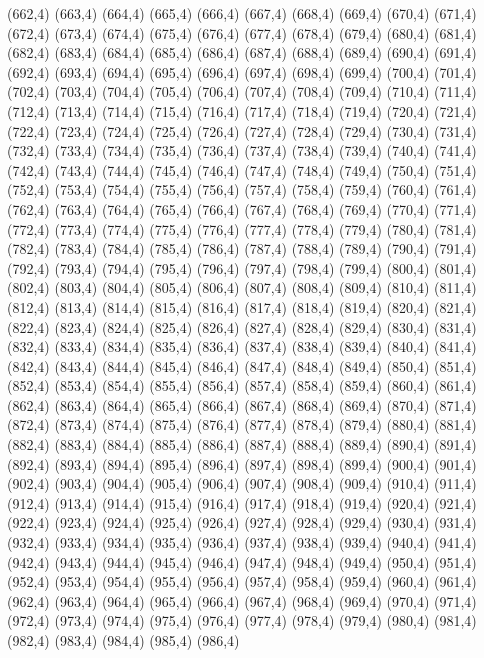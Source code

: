(662,4)
(663,4)
(664,4)
(665,4)
(666,4)
(667,4)
(668,4)
(669,4)
(670,4)
(671,4)
(672,4)
(673,4)
(674,4)
(675,4)
(676,4)
(677,4)
(678,4)
(679,4)
(680,4)
(681,4)
(682,4)
(683,4)
(684,4)
(685,4)
(686,4)
(687,4)
(688,4)
(689,4)
(690,4)
(691,4)
(692,4)
(693,4)
(694,4)
(695,4)
(696,4)
(697,4)
(698,4)
(699,4)
(700,4)
(701,4)
(702,4)
(703,4)
(704,4)
(705,4)
(706,4)
(707,4)
(708,4)
(709,4)
(710,4)
(711,4)
(712,4)
(713,4)
(714,4)
(715,4)
(716,4)
(717,4)
(718,4)
(719,4)
(720,4)
(721,4)
(722,4)
(723,4)
(724,4)
(725,4)
(726,4)
(727,4)
(728,4)
(729,4)
(730,4)
(731,4)
(732,4)
(733,4)
(734,4)
(735,4)
(736,4)
(737,4)
(738,4)
(739,4)
(740,4)
(741,4)
(742,4)
(743,4)
(744,4)
(745,4)
(746,4)
(747,4)
(748,4)
(749,4)
(750,4)
(751,4)
(752,4)
(753,4)
(754,4)
(755,4)
(756,4)
(757,4)
(758,4)
(759,4)
(760,4)
(761,4)
(762,4)
(763,4)
(764,4)
(765,4)
(766,4)
(767,4)
(768,4)
(769,4)
(770,4)
(771,4)
(772,4)
(773,4)
(774,4)
(775,4)
(776,4)
(777,4)
(778,4)
(779,4)
(780,4)
(781,4)
(782,4)
(783,4)
(784,4)
(785,4)
(786,4)
(787,4)
(788,4)
(789,4)
(790,4)
(791,4)
(792,4)
(793,4)
(794,4)
(795,4)
(796,4)
(797,4)
(798,4)
(799,4)
(800,4)
(801,4)
(802,4)
(803,4)
(804,4)
(805,4)
(806,4)
(807,4)
(808,4)
(809,4)
(810,4)
(811,4)
(812,4)
(813,4)
(814,4)
(815,4)
(816,4)
(817,4)
(818,4)
(819,4)
(820,4)
(821,4)
(822,4)
(823,4)
(824,4)
(825,4)
(826,4)
(827,4)
(828,4)
(829,4)
(830,4)
(831,4)
(832,4)
(833,4)
(834,4)
(835,4)
(836,4)
(837,4)
(838,4)
(839,4)
(840,4)
(841,4)
(842,4)
(843,4)
(844,4)
(845,4)
(846,4)
(847,4)
(848,4)
(849,4)
(850,4)
(851,4)
(852,4)
(853,4)
(854,4)
(855,4)
(856,4)
(857,4)
(858,4)
(859,4)
(860,4)
(861,4)
(862,4)
(863,4)
(864,4)
(865,4)
(866,4)
(867,4)
(868,4)
(869,4)
(870,4)
(871,4)
(872,4)
(873,4)
(874,4)
(875,4)
(876,4)
(877,4)
(878,4)
(879,4)
(880,4)
(881,4)
(882,4)
(883,4)
(884,4)
(885,4)
(886,4)
(887,4)
(888,4)
(889,4)
(890,4)
(891,4)
(892,4)
(893,4)
(894,4)
(895,4)
(896,4)
(897,4)
(898,4)
(899,4)
(900,4)
(901,4)
(902,4)
(903,4)
(904,4)
(905,4)
(906,4)
(907,4)
(908,4)
(909,4)
(910,4)
(911,4)
(912,4)
(913,4)
(914,4)
(915,4)
(916,4)
(917,4)
(918,4)
(919,4)
(920,4)
(921,4)
(922,4)
(923,4)
(924,4)
(925,4)
(926,4)
(927,4)
(928,4)
(929,4)
(930,4)
(931,4)
(932,4)
(933,4)
(934,4)
(935,4)
(936,4)
(937,4)
(938,4)
(939,4)
(940,4)
(941,4)
(942,4)
(943,4)
(944,4)
(945,4)
(946,4)
(947,4)
(948,4)
(949,4)
(950,4)
(951,4)
(952,4)
(953,4)
(954,4)
(955,4)
(956,4)
(957,4)
(958,4)
(959,4)
(960,4)
(961,4)
(962,4)
(963,4)
(964,4)
(965,4)
(966,4)
(967,4)
(968,4)
(969,4)
(970,4)
(971,4)
(972,4)
(973,4)
(974,4)
(975,4)
(976,4)
(977,4)
(978,4)
(979,4)
(980,4)
(981,4)
(982,4)
(983,4)
(984,4)
(985,4)
(986,4)
